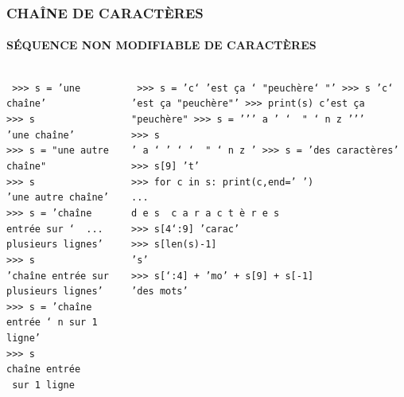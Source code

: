 \begin{frame}
\frametitle{\uppercase{Chaîne de caractères}}
\framesubtitle{\uppercase{séquence non modifiable de caractères}}

\begin{columns}[T]
\column{5.25cm}
\begin{py}{5.25cm}\tt
>{>}> s = 'une chaîne'\\%
>{>}> s\\
'une chaîne'\\%
>{>}> s = "une autre chaîne"\\
>{>}> s\\
'une autre chaîne'\\%
>{>}> s = 'chaîne entrée sur \char`\\ \\
... plusieurs lignes'\\
>{>}> s\\
'chaîne entrée sur plusieurs lignes'\\%
>{>}> s = 'chaîne entrée \char`\\n sur 1 ligne'\\
>{>}> s\\
chaîne entrée\\
\mbox{}\ sur 1 ligne
\end{py}

\column{5.25cm}
\begin{py}{5.25cm}\tt
>{>}> s = 'c\char`\\'est ça \char`\\"peuchère\char`\\"'\\
>{>}> s\\
'c\char`\\'est ça "peuchère"'\\
>{>}> print(s)\\
c'est ça "peuchère"\\%
>{>}> s = ''' a ' \char`\\\ " \char`\\n z '''\\
>{>}> s\\
' a \char`\\' \char`\\\char`\\\ " \char`\\n z '\\
>{>}> s = 'des caractères'\\
>{>}> s[9]\\
't'\\
>{>}> for c in s: print(c,end=' ')\\
... \\
d e s \  c a r a c t è r e s\\
>{>}> s[4\char`:9]\\
'carac'\\
>{>}> s[len(s)-1]\\
's'\\
>{>}> s[\char`:4] + 'mo' + s[9] + s[-1]\\
'des mots'
\end{py}
\end{columns}


\end{frame}

